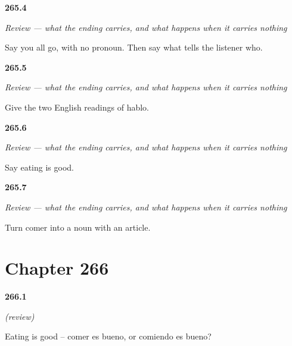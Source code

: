 \noindent\begin{minipage}[t]{\linewidth}
\raggedright
\hypertarget{review-ES-C67-repaso-la-terminacion-y-el-infinitivo-prodrop}{\textbf{265.4}} \emph{Review — what the ending carries, and what happens when it carries nothing}\par
\small Say you all go, with no pronoun. Then say what tells the listener who.
\end{minipage}\par\medskip

\noindent\begin{minipage}[t]{\linewidth}
\raggedright
\hypertarget{review-ES-C67-repaso-la-terminacion-y-el-infinitivo-dos}{\textbf{265.5}} \emph{Review — what the ending carries, and what happens when it carries nothing}\par
\small Give the two English readings of hablo.
\end{minipage}\par\medskip

\noindent\begin{minipage}[t]{\linewidth}
\raggedright
\hypertarget{review-ES-C67-repaso-la-terminacion-y-el-infinitivo-sujeto}{\textbf{265.6}} \emph{Review — what the ending carries, and what happens when it carries nothing}\par
\small Say eating is good.
\end{minipage}\par\medskip

\noindent\begin{minipage}[t]{\linewidth}
\raggedright
\hypertarget{review-ES-C67-repaso-la-terminacion-y-el-infinitivo-nombre}{\textbf{265.7}} \emph{Review — what the ending carries, and what happens when it carries nothing}\par
\small Turn comer into a noun with an article.
\end{minipage}\par\medskip

\section*{Chapter 266}

\noindent\begin{minipage}[t]{\linewidth}
\raggedright
\hypertarget{review-ES-C67-repaso-a1-inf}{\textbf{266.1}} \emph{(review)}\par
\small Eating is good -- comer es bueno, or comiendo es bueno?
\end{minipage}\par\medskip

